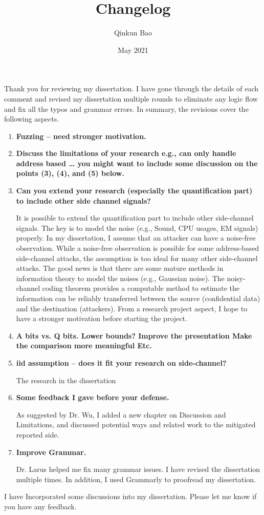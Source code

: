 \documentclass{article}
\title{Changelog}
\author{Qinkun Bao}
\date{May 2021}
\begin{document}
\maketitle
Thank you for reviewing my dissertation. I have gone through the details of each comment and revised my dissertation multiple rounds to eliminate any logic flow and fix all the typos and grammar errors. In summary, the revisions cover the following aspects.


\begin{enumerate}
\item \textbf{Fuzzing – need stronger motivation.}
\item \textbf{Discuss the limitations of your research
e.g., can only handle address based …
you might want to include some discussion on the points (3), (4), and (5) below.}
\item \textbf{Can you extend your research (especially the quantification part) to include other side channel signals?}

It is possible to extend the quantification part to include other side-channel signals. The key is to model the noise (e.g., Sound, CPU usages, EM signals) properly. In my dissertation, I assume that an attacker can have a noise-free observation. While a noise-free observation is possible for some address-based side-channel attacks, the assumption is too ideal for many other side-channel attacks. The good news is that there are some mature methods in information theory to model the noises (e.g., Gaussian noise). The noisy-channel coding theorem provides a computable method to estimate the information can be reliably transferred between the source (confidential data) and the destination (attackers). From a research project aspect, I hope to have a stronger motivation before starting the project. 
\item \textbf{A bits vs. Q bits. Lower bounds?
       Improve the presentation
       Make the comparison more meaningful
       Etc.}
\item \textbf{iid assumption – does it fit your research on side-channel?}

The research in the dissertation 


\item \textbf{Some feedback I gave before your defense.}

As suggested by Dr. Wu, I added a new chapter on Discussion and Limitations, and discussed potential ways and related work to the mitigated reported side.

\item \textbf{Improve Grammar.}

Dr. Larus helped me fix many grammar issues. I have revised the dissertation multiple times. In addition, I used Grammarly to proofread my dissertation.
\end{enumerate}

I have Incorporated some discussions into my dissertation. Please let me know if you have any feedback.
\end{document}
